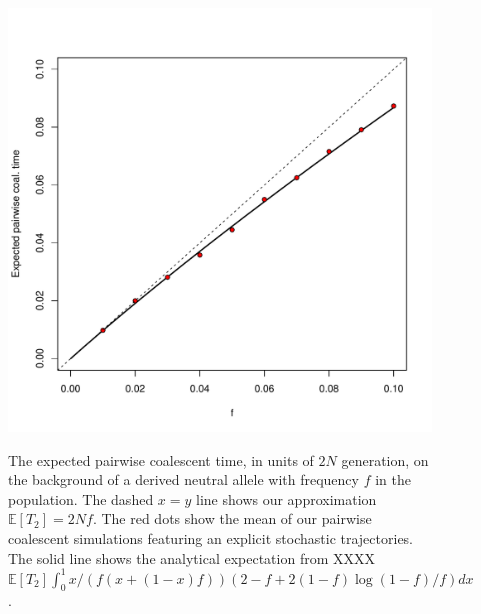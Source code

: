 \documentclass[a4paper,10pt]{article}
\begin{document}
\setcounter{table}{0}
\renewcommand{\thetable}{S\arabic{table}}
\setcounter{figure}{0}
\renewcommand{\thefigure}{S\arabic{figure}}


\begin{figure}
	\includegraphics[width = \textwidth]{../Paper_Figures/n_two_coal_time.pdf} \label{n_2_supp_plot}
\caption{The expected pairwise coalescent time, in units of $2N$ generation, on the background of a derived neutral allele with frequency $f$ in the population.  The dashed $x=y$ line shows our approximation $\mathbb{E}  [T_2]=2Nf$. The red dots show the mean of our pairwise coalescent simulations featuring an explicit stochastic trajectories. The solid line shows the analytical expectation from XXXX  
$\mathbb{E} [T_2] \int_0^1 x/(f (x+(1-x)f))(2-f+2(1-f) \log(1-f)/f) dx $.}
\end{figure}   %
\end{document}
